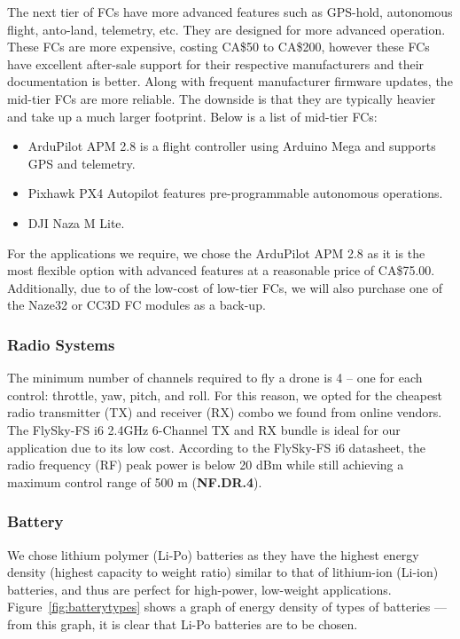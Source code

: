 The next tier of FCs have more advanced features such as GPS-hold, autonomous flight, anto-land, 
telemetry, etc. They are designed for more advanced operation. These FCs are more expensive, costing 
CA\$50 to CA\$200, however these FCs have excellent after-sale support for their respective 
manufacturers and their documentation is better. Along 
with frequent manufacturer firmware updates, the mid-tier FCs are more reliable. The downside is that 
they are typically heavier and take up a much larger footprint. 
Below is a list of mid-tier FCs:

\begin{itemize}[noitemsep,topsep=0pt, parsep=4pt, partopsep=0pt]
    \item ArduPilot APM 2.8 is a flight controller using Arduino Mega and supports GPS and telemetry.
    \item Pixhawk PX4 Autopilot features pre-programmable autonomous operations.
    \item DJI Naza M Lite.
\end{itemize}

For the applications we require, we chose the ArduPilot APM 2.8 as it is the most flexible option with advanced features at a reasonable price of CA\$75.00. Additionally, due to of the low-cost of low-tier FCs, we will also purchase one of the Naze32 or CC3D FC modules as a back-up.

\subsubsection{Radio Systems}

The minimum number of channels required to fly a drone is 4 -- one for each control: throttle, yaw, 
pitch, and roll. For this reason, we opted for the cheapest radio transmitter (TX) and receiver  (RX) 
combo we found from online vendors. 
The FlySky-FS i6 2.4GHz 6-Channel TX and RX bundle is ideal for our application due to its low cost.
According to the FlySky-FS i6 datasheet\cite{flyskyi6}, the radio frequency (RF) peak power is below 20 dBm while still achieving a maximum control range of 500 m (\textbf{NF.DR.4}).

\subsubsection{Battery}

We chose lithium polymer (Li-Po) batteries as they have the highest energy density (highest capacity to weight ratio) similar to that of lithium-ion (Li-ion) batteries, and thus are perfect for high-power, low-weight applications. Figure~\ref{fig:batterytypes} shows a graph of energy density of types of batteries \cite{battery} --- from this graph, it is clear that Li-Po batteries are to be chosen.

